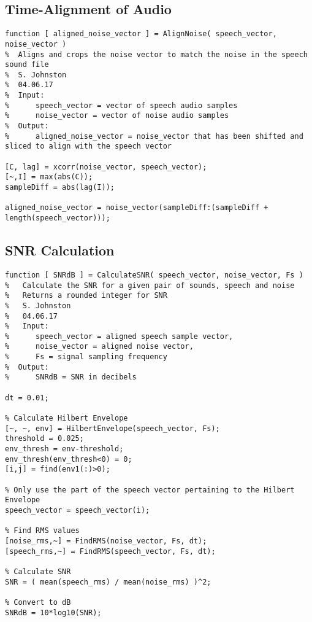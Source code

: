 \subsection{Time-Alignment of Audio}

\begin{verbatim}
function [ aligned_noise_vector ] = AlignNoise( speech_vector, noise_vector )
%  Aligns and crops the noise vector to match the noise in the speech sound file
%  S. Johnston
%  04.06.17
%  Input:
%      speech_vector = vector of speech audio samples
%      noise_vector = vector of noise audio samples
%  Output:
%      aligned_noise_vector = noise_vector that has been shifted and sliced to align with the speech vector

[C, lag] = xcorr(noise_vector, speech_vector);
[~,I] = max(abs(C));
sampleDiff = abs(lag(I));

aligned_noise_vector = noise_vector(sampleDiff:(sampleDiff + length(speech_vector)));
\end{verbatim}


\subsection{SNR Calculation}

\begin{verbatim}
function [ SNRdB ] = CalculateSNR( speech_vector, noise_vector, Fs )
%   Calculate the SNR for a given pair of sounds, speech and noise
%   Returns a rounded integer for SNR
%   S. Johnston
%   04.06.17
%   Input: 
%      speech_vector = aligned speech sample vector, 
%      noise_vector = aligned noise vector, 
%      Fs = signal sampling frequency
%  Output:
%      SNRdB = SNR in decibels

dt = 0.01;

% Calculate Hilbert Envelope
[~, ~, env] = HilbertEnvelope(speech_vector, Fs);
threshold = 0.025;
env_thresh = env-threshold;
env_thresh(env_thresh<0) = 0;
[i,j] = find(env1(:)>0);

% Only use the part of the speech vector pertaining to the Hilbert Envelope
speech_vector = speech_vector(i);

% Find RMS values
[noise_rms,~] = FindRMS(noise_vector, Fs, dt);
[speech_rms,~] = FindRMS(speech_vector, Fs, dt);

% Calculate SNR
SNR = ( mean(speech_rms) / mean(noise_rms) )^2;

% Convert to dB
SNRdB = 10*log10(SNR);
\end{verbatim}

